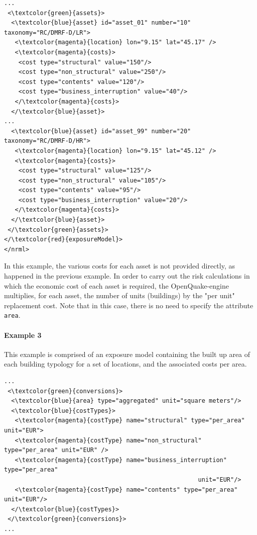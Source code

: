 \begin{Verbatim}[frame=single, commandchars=\\\{\}, samepage=false]
...
 <\textcolor{green}{assets}>
  <\textcolor{blue}{asset} id="asset_01" number="10" taxonomy="RC/DMRF-D/LR">
   <\textcolor{magenta}{location} lon="9.15" lat="45.17" />
   <\textcolor{magenta}{costs}>
    <cost type="structural" value="150"/>
    <cost type="non_structural" value="250"/>
    <cost type="contents" value="120"/>
    <cost type="business_interruption" value="40"/>
   </\textcolor{magenta}{costs}>
  </\textcolor{blue}{asset}>
...
  <\textcolor{blue}{asset} id="asset_99" number="20" taxonomy="RC/DMRF-D/HR">
   <\textcolor{magenta}{location} lon="9.15" lat="45.12" />
   <\textcolor{magenta}{costs}>
    <cost type="structural" value="125"/>
    <cost type="non_structural" value="105"/>
    <cost type="contents" value="95"/>
    <cost type="business_interruption" value="20"/>
   </\textcolor{magenta}{costs}>
  </\textcolor{blue}{asset}>
 </\textcolor{green}{assets}>
</\textcolor{red}{exposureModel}>
</nrml>
\end{Verbatim}

In this example, the various costs for each asset is not provided directly, as happened in the previous example. In order to carry out the risk calculations in which the economic cost of each asset is required, the OpenQuake-engine multiplies, for each asset, the number of units (buildings) by the "per unit" replacement cost. Note that in this case, there is no need to specify the attribute \Verb+area+.

\paragraph{Example 3}
This example is comprised of an \gls{exposure model} containing the built up area of each building typology for a set of locations, and the associated costs per area.

\begin{Verbatim}[frame=single, commandchars=\\\{\}, samepage=false]
...
 <\textcolor{green}{conversions}>
  <\textcolor{blue}{area} type="aggregated" unit="square meters"/>
  <\textcolor{blue}{costTypes}>
   <\textcolor{magenta}{costType} name="structural" type="per_area" unit="EUR">
   <\textcolor{magenta}{costType} name="non_structural" type="per_area" unit="EUR" />
   <\textcolor{magenta}{costType} name="business_interruption" type="per_area" 
                                                      unit="EUR"/>
   <\textcolor{magenta}{costType} name="contents" type="per_area" unit="EUR"/>
  </\textcolor{blue}{costTypes}>
 </\textcolor{green}{conversions}>
...
\end{Verbatim}

